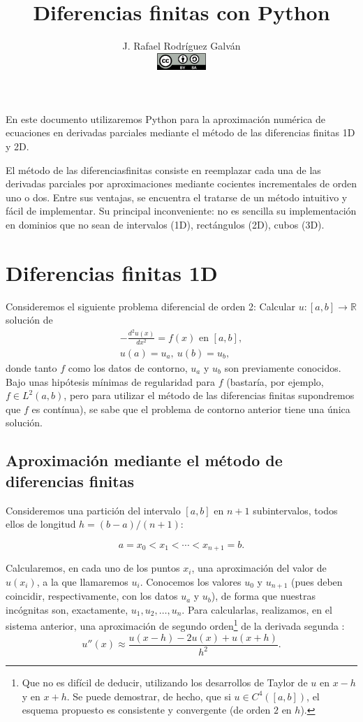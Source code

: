 \documentclass[11pt,spanish]{article}
\title{Diferencias finitas con Python}
\author{J. Rafael Rodríguez Galván \\[2em] \includegraphics[width=5em]{cc-by-sa}}
\def\Rset{\mathbb{R}}
\newcommand{\en}{\mbox{\ en \ }}
\begin{document}
\maketitle

  En este documento utilizaremos Python para  la
  aproximación numérica de ecuaciones en derivadas parciales mediante
  el método de las diferencias finitas 1D y 2D.

El método de las diferenciasfinitas consiste en reemplazar cada una de
las derivadas parciales por aproximaciones mediante cocientes
incrementales de orden uno o dos. Entre sus ventajas, se encuentra el
tratarse de un método intuitivo y fácil de implementar. Su principal
inconveniente: no es sencilla su implementación en dominios que no sean
de intervalos (1D), rectángulos (2D), cubos (3D).

\section{Diferencias finitas 1D}
Consideremos el siguiente problema diferencial de orden 2:
Calcular $u:[a,b] \to  \Rset$ solución de
\begin{align}
  \label{pb1d}
  -\frac{d^2 u(x) }{dx^2} = f(x) \en [a,b], \\
  u(a)=u_a, \ u(b)=u_b,
\end{align}
donde tanto $f$ como los datos de contorno, $u_a$ y $u_b$ son
previamente conocidos. Bajo unas hipótesis mínimas de regularidad para
$f$ (bastaría, por ejemplo, $f\in L^2(a,b)$, pero para utilizar el método de las
diferencias finitas supondremos que $f$ es contínua), se sabe que el
problema de contorno anterior tiene una única solución.

\subsection{Aproximación mediante el método de diferencias finitas}
\label{sec:diferencias-finitas-dim-1}
Consideremos una partición del intervalo $[a,b]$ en $n+1$
subintervalos, todos ellos de longitud $h=(b-a)/(n+1)$:

$$
a=x_0 < x_1 < \cdots < x_{n+1} = b.
$$

Calcularemos, en cada uno de los puntos $x_i$, una aproximación del
valor de $u(x_i)$, a la que llamaremos $u_i$. Conocemos los valores $u_0$ y
$u_{n+1}$ (pues deben coincidir, respectivamente, con los datos $u_a$
y $u_b$), de forma que nuestras incógnitas son, exactamente, $u_1,
u_2,\dots,u_n$. Para calcularlas, realizamos, en el sistema anterior,
una aproximación de segundo orden\footnote{Que no es difícil de
  deducir, utilizando los desarrollos de Taylor de $u$ en
$x-h$ y en $x+h$. Se puede demostrar, de hecho, que si $u \in
C^4([a,b])$, el esquema propuesto es  consistente
y convergente (de orden $2$ en $h$).} de la derivada segunda
:
$$
u''(x) \approx \frac{u(x-h)-2u(x)+u(x+h)}{h^2}.
$$
\end{document}
